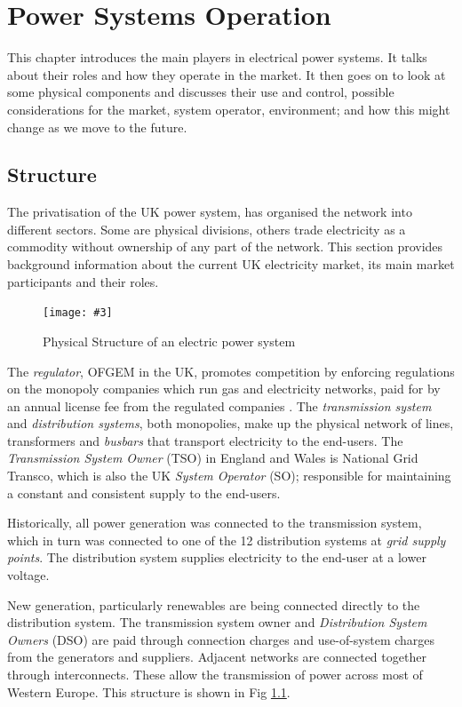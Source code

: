 \documentclass[a4paper,oneside,12pt]{report}
\newcommand{\image}[3] {
  \begin{figure}
    \begin{center}
      \texttt{[image: \#3]}
      \caption{#2}
      \label{#1}
    \end{center}
  \end{figure}
}
\begin{document}
\chapter{Power Systems Operation}

This chapter introduces the main players in electrical power systems. It talks about their roles and how they operate in the market. It then goes on to look at some physical components and discusses their use and control, possible considerations for the market, system operator, environment; and how this might change as we move to the future.

\section{Structure}

The privatisation of the UK power system, has organised the network into different sectors. Some are physical divisions, others trade electricity as a commodity without ownership of any part of the network. This section provides background information about the current UK electricity market, its main market participants and their roles.

\image{physicalstructure}{Physical Structure of an electric power system}{physicalstructure.png}

The \emph{regulator}, OFGEM in the UK, promotes competition by enforcing regulations on the monopoly companies which run gas and electricity networks, paid for by an annual license fee from the regulated companies \cite{OFGEM}. The \emph{transmission system} and \emph{distribution systems}, both monopolies, make up the physical network of lines, transformers and \emph{busbars} that transport electricity to the end-users. The \emph{Transmission System Owner} (TSO) in England and Wales is National Grid Transco, which is also the UK \emph{System Operator} (SO); responsible for maintaining a constant and consistent supply to the end-users.

Historically, all power generation was connected to the transmission system, which in turn was connected to one of the 12 distribution systems at \emph{grid supply points}. The distribution system supplies electricity to the end-user at a lower voltage.

New generation, particularly renewables are being connected directly to the distribution system. The transmission system owner and \emph{Distribution System Owners} (DSO) are paid through connection charges and use-of-system charges from the generators and suppliers. Adjacent networks are connected together through interconnects. These allow the transmission of power across most of Western Europe. This structure is shown in Fig \ref{physicalstructure}.
\end{document}
